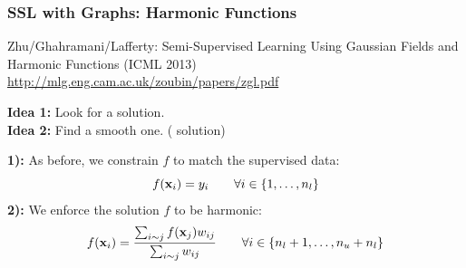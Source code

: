 \documentclass{beamer}
\newcommand{\misoclasstinytitleslide}{Partially based on material by:   Gary Miller, \\ Mikhail Belkin, Branislav Kveton, \\[-1em] Doyle \& Schnell, Daniel Spielman}
\begin{document}
\newcommand{\topictitle}{SSL with Graphs: Harmonic Functions}
\newcommand{\topicsubtitle}{Gaussian Random Fields Solution}
\renewcommand{\misoclasstinytitleslide}{Partially based on material by:  Mikhail Belkin, Partha Niyogi, \\[-1em] Olivier Chapelle, Bernhard Sch\"olkopf}

\MakeTopicSlide

\begin{frame}
\frametitle{SSL with Graphs: Harmonic Functions}

{\small Zhu/Ghahramani/Lafferty: Semi-Supervised Learning Using Gaussian Fields and Harmonic Functions \textsc{(ICML 2013)}}
{\scriptsize 
\url{http://mlg.eng.cam.ac.uk/zoubin/papers/zgl.pdf}
}
\pause \\

\pause

\textbf{Idea 1:} Look for a  solution. \\
\pause
\textbf{Idea 2:} Find a smooth one. \pause ( solution) \\

\pause 


\textbf{1):} As before, we constrain $f$ to match the supervised data: \pause
$$
f(\mathbf{x}_i) = y_i \qquad \forall i \in \{1, \dots, n_l \}
$$
\pause
\textbf{2):} We enforce the solution $f$ to be harmonic: \pause
$$
f(\mathbf{x}_i) = \frac{\sum_{i\sim j} f(\mathbf{x}_j)w_{ij}}{\sum_{i\sim j}   w_{ij}} \qquad \forall i \in \{n_l+1, \dots, n_u+n_l \}
$$
% 
% 
% 

\end{frame}
\end{document}
